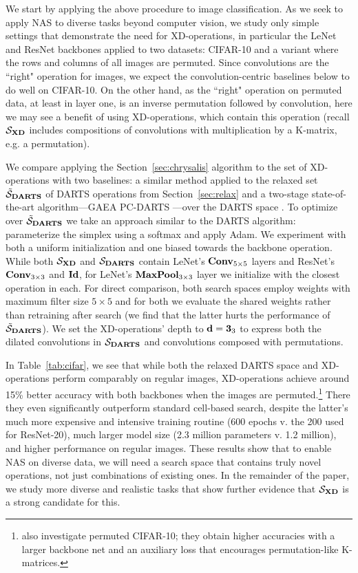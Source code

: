 We start by applying the above procedure to image classification.
As we seek to apply NAS to diverse tasks beyond computer vision, we study only simple settings that demonstrate the need for XD-operations, in particular the LeNet \citep{lecun1999lenet} and ResNet \citep{he2016resnet} backbones applied to two datasets: 
CIFAR-10 \citep{krizhevsky2009cifar} and a variant where the rows and columns of all images are permuted.
Since convolutions are the ``right" operation for images, we expect the convolution-centric baselines below to do well on CIFAR-10.
On the other hand, as the ``right" operation on permuted data, at least in layer one, is an inverse permutation followed by convolution, here we may see a benefit of using XD-operations, which contain this operation (recall $\mathcal S_{\mathbf{XD}}$ includes compositions of convolutions with multiplication by a K-matrix, e.g. a permutation).

We compare applying the Section~\ref{sec:chrysalis} algorithm to the set of XD-operations with two baselines:
a similar method applied to the relaxed set $\tilde{\mathcal S}_{\mathbf{DARTS}}$ of DARTS operations from Section~\ref{sec:relax} and a two-stage state-of-the-art algorithm---GAEA PC-DARTS \citep{li2021gaea}---over the DARTS space \cite{liu2019darts}.
To optimize over $\tilde{\mathcal S}_{\mathbf{DARTS}}$ we take an approach similar to the DARTS algorithm:
parameterize the simplex using a softmax and apply Adam.
We experiment with both a uniform initialization and one biased towards the backbone operation.
While both $\mathcal S_{\mathbf{XD}}$ and $\mathcal S_{\mathbf{DARTS}}$ contain LeNet's $\operatorname{\operatorname{\bf Conv}}_{5\times 5}$ layers and ResNet's $\operatorname{\operatorname{\bf Conv}}_{3\times 3}$ and $\operatorname{\operatorname{\bf Id}}$, for LeNet's $\operatorname{\operatorname{\bf MaxPool}}_{3\times 3}$ layer we initialize with the closest operation in each.
For direct comparison, both search spaces employ weights with maximum filter size $5\times 5$ and for both we evaluate the shared weights rather than retraining after search (we find that the latter hurts the performance of $\tilde{\mathcal S}_{\mathbf{DARTS}}$).
We set the XD-operations' depth to $\mathbf{d}=\mathbf{3}_3$ to express both the dilated convolutions in $\mathcal S_{\mathbf{DARTS}}$ and convolutions composed with permutations.

In Table~\ref{tab:cifar}, we see that while both the relaxed DARTS space and XD-operations perform comparably on regular images, XD-operations achieve around 15\% better accuracy with both backbones when the images are permuted.\footnote{\citet{dao2020kaleidoscope} also investigate permuted CIFAR-10; they obtain higher accuracies with a larger backbone net and an auxiliary loss that encourages permutation-like K-matrices.}
There they even significantly outperform standard cell-based search, despite the latter's much more expensive and intensive training routine (600 epochs v. the 200 used for ResNet-20), much larger model size (2.3 million parameters v. 1.2 million), and higher performance on regular images.
These results show that to enable NAS on diverse data, we will need a search space that contains truly novel operations, not just combinations of existing ones.
In the remainder of the paper, we study more diverse and realistic tasks that show further evidence that $\mathcal S_{\mathbf{XD}}$ is a strong candidate for this.

